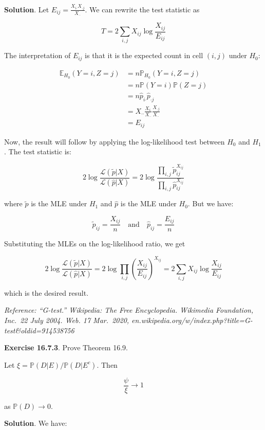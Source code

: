 {\textbf{Solution}. Let
\(E_{ij} = \frac{X_{i\text{·}} X_{\text{·}j}}{X_\text{··}}\). We can
rewrite the test statistic as

\[ T = 2 \sum_{i, j} X_{ij} \log \frac{X_{ij}}{E_{ij}} \]

The interpretation of \(E_{ij}\) is that it is the expected count in
cell \((i, j)\) under \(H_0\):

\begin{align}
\mathbb{E}_{H_0}(Y = i, Z = j) &= n \mathbb{P}_{H_0}(Y = i, Z = j) \\
&= n \mathbb{P}(Y = i) \mathbb{P}(Z = j) \\
&= n \hat{p}_{i\text{·}} \hat{p}_{\text{·}j} \\
&= X_{\text{··}} \frac{X_{i\text{·}}}{X_{\text{··}}} \frac{X_{\text{·}j}}{X_{\text{··}}} \\
&= E_{ij}
\end{align}

Now, the result will follow by applying the log-likelihood test between
\(H_0\) and \(H_1\). The test statistic is:

\[ 2 \log \frac{\mathcal{L}(\tilde{p} | X)}{\mathcal{L}(\hat{p} | X)} 
= 2 \log \frac{\prod_{i, j} \tilde{p}_{ij}^{X_{ij}}}{\prod_{i, j} \hat{p}_{ij}^{X_{ij}}}\]

where \(\tilde{p}\) is the MLE under \(H_1\) and \(\hat{p}\) is the MLE
under \(H_0\). But we have:

\[
\tilde{p}_{ij} = \frac{X_{ij}}{n}
\quad \text{and} \quad
\hat{p}_{ij} = \frac{E_{ij}}{n}
\]

Substituting the MLEs on the log-likelihood ratio, we get

\[ 2 \log \frac{\mathcal{L}(\tilde{p} | X)}{\mathcal{L}(\hat{p} | X)} 
= 2 \log \prod_{i, j} \left( \frac{X_{ij}}{E_{ij}} \right)^{X_{ij}}
= 2 \sum_{i, j} X_{ij} \log \frac{X_{ij}}{E_{ij}}
\]

which is the desired result.

\emph{Reference: ``G-test.'' Wikipedia: The Free Encyclopedia. Wikimedia
Foundation, Inc.~22 July 2004. Web. 17 Mar.~2020,
en.wikipedia.org/w/index.php?title=G-test\&oldid=914538756}

\textbf{Exercise 16.7.3}. Prove Theorem 16.9.

Let \(\xi = \mathbb{P}(D | E) / \mathbb{P}(D | E^c)\). Then

\[ \frac{\psi}{\xi} \rightarrow 1\]

as \(\mathbb{P}(D) \rightarrow 0\).

\textbf{Solution}. We have:

}
